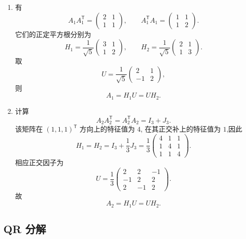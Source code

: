 \begin{solution}
\leavevmode
\begin{enumerate}
    \item 有
    \[
    A_1A_1^{\mathsf T}
    =
    \begin{pmatrix}
    2&1\\
    1&1
    \end{pmatrix},
    \qquad
    A_1^{\mathsf T}A_1
    =
    \begin{pmatrix}
    1&1\\
    1&2
    \end{pmatrix}.
    \]
    它们的正定平方根分别为
    \[
    H_1=
    \dfrac1{\sqrt5}
    \begin{pmatrix}
    3&1\\
    1&2
    \end{pmatrix},
    \qquad
    H_2=
    \dfrac1{\sqrt5}
    \begin{pmatrix}
    2&1\\
    1&3
    \end{pmatrix}.
    \]
    取
    \[
    U=
    \dfrac1{\sqrt5}
    \begin{pmatrix}
    2&1\\
    -1&2
    \end{pmatrix},
    \]
    则
    \[
    \boxed{A_1=H_1U=UH_2}.
    \]

    \item 计算
    \[
    A_2A_2^{\mathsf T}
    =
    A_2^{\mathsf T}A_2
    =
    I_3+J_3.
    \]
    该矩阵在 $(1,1,1)^{\mathsf T}$ 方向上的特征值为 $4$,
    在其正交补上的特征值为 $1$,因此
    \[
    H_1=H_2=
    I_3+\dfrac13J_3
    =
    \dfrac13
    \begin{pmatrix}
    4&1&1\\
    1&4&1\\
    1&1&4
    \end{pmatrix}.
    \]
    相应正交因子为
    \[
    U=
    \dfrac13
    \begin{pmatrix}
    2&2&-1\\
    -1&2&2\\
    2&-1&2
    \end{pmatrix}.
    \]
    故
    \[
    \boxed{A_2=H_1U=UH_2}.
    \]
\end{enumerate}
\end{solution}


\subsection{QR 分解}

